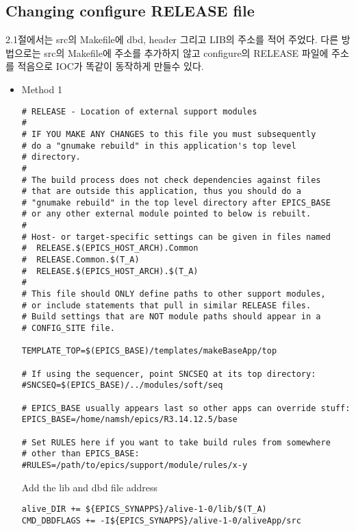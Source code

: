 \documentclass[11pt
  , a4paper
  , article
  , oneside
]{memoir}
\begin{document}
\subsection{Changing configure RELEASE file}
2.1절에서는 src의 Makefile에 dbd, header 그리고 LIB의 주소를 적어 주었다. 다른 방법으로는
src의 Makefile에 주소를 추가하지 않고 configure의 RELEASE 파일에 주소를 적음으로 IOC가 똑같이
동작하게 만들수 있다.
\begin{itemize}
\item Method 1	

\begin{lstlisting}[style=termstyle]
# RELEASE - Location of external support modules
#
# IF YOU MAKE ANY CHANGES to this file you must subsequently
# do a "gnumake rebuild" in this application's top level
# directory.
#
# The build process does not check dependencies against files
# that are outside this application, thus you should do a
# "gnumake rebuild" in the top level directory after EPICS_BASE
# or any other external module pointed to below is rebuilt.
#
# Host- or target-specific settings can be given in files named
#  RELEASE.$(EPICS_HOST_ARCH).Common
#  RELEASE.Common.$(T_A)
#  RELEASE.$(EPICS_HOST_ARCH).$(T_A)
#
# This file should ONLY define paths to other support modules,
# or include statements that pull in similar RELEASE files.
# Build settings that are NOT module paths should appear in a
# CONFIG_SITE file.

TEMPLATE_TOP=$(EPICS_BASE)/templates/makeBaseApp/top

# If using the sequencer, point SNCSEQ at its top directory:
#SNCSEQ=$(EPICS_BASE)/../modules/soft/seq

# EPICS_BASE usually appears last so other apps can override stuff:
EPICS_BASE=/home/namsh/epics/R3.14.12.5/base

# Set RULES here if you want to take build rules from somewhere
# other than EPICS_BASE:
#RULES=/path/to/epics/support/module/rules/x-y
\end{lstlisting}
Add the lib and dbd file address
	\begin{lstlisting}[style=termstyle]
alive_DIR += ${EPICS_SYNAPPS}/alive-1-0/lib/$(T_A)
CMD_DBDFLAGS += -I${EPICS_SYNAPPS}/alive-1-0/aliveApp/src


\end{lstlisting}
\end{itemize}
\end{document}
